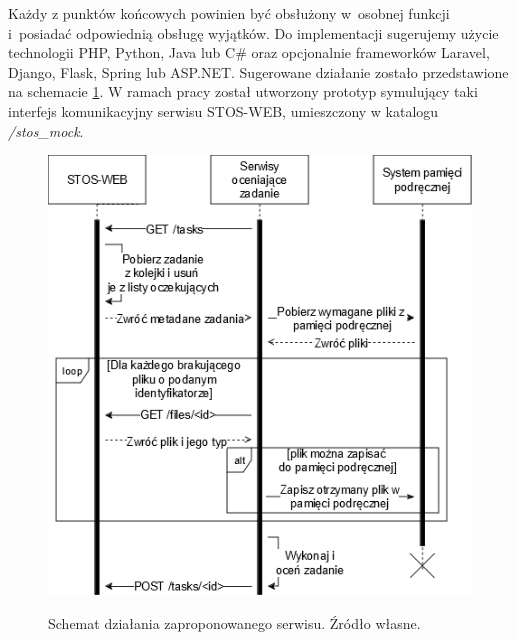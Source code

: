 Każdy z punktów końcowych powinien być obsłużony w~osobnej funkcji i~posiadać odpowiednią obsługę wyjątków. Do implementacji sugerujemy użycie technologii PHP, Python, Java lub C\# oraz opcjonalnie frameworków Laravel, Django, Flask, Spring lub ASP.NET. Sugerowane działanie zostało przedstawione na schemacie \ref{stos-suggestion}. W ramach pracy został utworzony prototyp symulujący taki interfejs komunikacyjny serwisu STOS-WEB, umieszczony w katalogu \textit{/stos\_mock}.
\begin{figure}[!h]
	\begin{center}
		\resizebox{0.8\textwidth}{!} {
			\includegraphics{img/5/stos-suggestion.png}
		}
		\caption[Schemat działania zaproponowanego serwisu. Źródło własne.]{Schemat działania zaproponowanego serwisu. Źródło własne.}
    \label{stos-suggestion}
	\end{center}
\end{figure}
